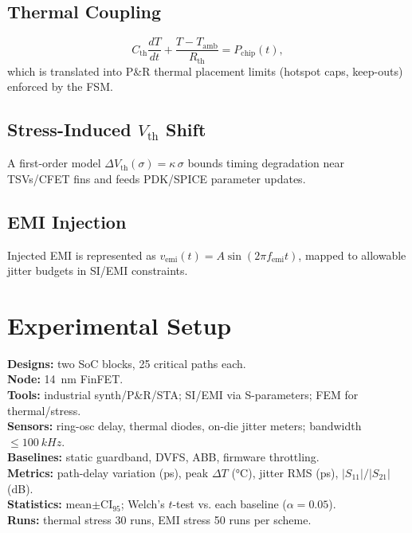 \documentclass[conference]{IEEEtran}
\newcommand{\CI}{\mathrm{CI}_{95}}
\begin{document}
\subsection{Thermal Coupling}
\begin{equation}
C_{\mathrm{th}}\frac{dT}{dt}+\frac{T-T_{\mathrm{amb}}}{R_{\mathrm{th}}}=P_{\mathrm{chip}}(t),
\label{eq:thermal}
\end{equation}
which is translated into P\&R thermal placement limits (hotspot caps, keep-outs) enforced by the FSM.

\subsection{Stress-Induced $V_\mathrm{th}$ Shift}
A first-order model
\(
\Delta V_{\mathrm{th}}(\sigma)=\kappa\,\sigma
\)
bounds timing degradation near TSVs/CFET fins and feeds PDK/SPICE parameter updates.

\subsection{EMI Injection}
Injected EMI is represented as
\(
v_{\mathrm{emi}}(t)=A\sin (2\pi f_{\mathrm{emi}} t)
\),
mapped to allowable jitter budgets in SI/EMI constraints.

\section{Experimental Setup}
\textbf{Designs:} two SoC blocks, 25 critical paths each.\\
\textbf{Node:} \SI{14}{\nano\meter} FinFET.\\
\textbf{Tools:} industrial synth/P\&R/STA; SI/EMI via S-parameters; FEM for thermal/stress.\\
\textbf{Sensors:} ring-osc delay, thermal diodes, on-die jitter meters; bandwidth $\leq\SI{100}{kHz}$.\\
\textbf{Baselines:} static guardband, DVFS, ABB, firmware throttling.\\
\textbf{Metrics:} path-delay variation (ps), peak $\Delta T$ (\si{\celsius}), jitter RMS (ps), $|S_{11}|/|S_{21}|$ (dB).\\
\textbf{Statistics:} mean$\pm\CI$; Welch's $t$-test vs. each baseline ($\alpha=0.05$).\\
\textbf{Runs:} thermal stress 30 runs, EMI stress 50 runs per scheme.

\end{document}
